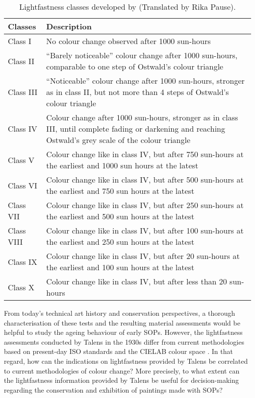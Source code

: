 \begin{table*}[!h]
\caption[\hspace{0.3cm}Description of the lightfastness classes developed by H. Wagner]{Lightfastness classes developed by \citet[p.33]{wagner_korperfarben_1928} (Translated by Rika Pause).}
\centering
\begin{tabular}{p{2cm}p{12cm}}
\toprule[0.4mm]
\textbf{Classes} & \textbf{Description} \\\midrule
Class I & No colour change observed after 1000 sun-hours  \\ 
Class II & “Barely noticeable” colour change after 1000 sun-hours, comparable to one step of Ostwald’s colour triangle \\
Class III & “Noticeable” colour change after 1000 sun-hours, stronger as in class II, but not more than 4 steps of Ostwald’s colour triangle \\
Class IV & Colour change after 1000 sun-hours, stronger as in class III, until complete fading or darkening and reaching Ostwald’s grey scale of the colour triangle \\
Class V & Colour change like in class IV, but after 750 sun-hours at the earliest and 1000 sun hours at the latest \\
Class VI & Colour change like in class IV, but after 500 sun-hours at the earliest and 750 sun hours at the latest \\
Class VII & Colour change like in class IV, but after 250 sun-hours at the earliest and 500 sun hours at the latest\\
Class VIII & Colour change like in class IV, but after 100 sun-hours at the earliest and 250 sun hours at the latest \\
Class IX & Colour change like in class IV, but after 20 sun-hours at the earliest and 100 sun hours at the latest \\
Class X & Colour change like in class IV, but after less than 20 sun-hours \\\bottomrule[0.4mm]
\end{tabular}
\label{tab:Wagner_classes}
\end{table*}

From today's technical art history and conservation perspectives, a thorough characterisation of these tests and the resulting material assessments would be helpful to study the ageing behaviour of early \gls{SOP}s. However, the lightfastness assessments conducted by Talens in the 1930s differ from current methodologies based on present-day ISO standards \citep{international_organization_for_standardization_textiles_2014} and the CIELAB colour space \citep{schanda_colorimetry_2007}. In that regard, how can the indications on lightfastness provided by Talens be correlated to current methodologies of colour change? More precisely, to what extent can the lightfastness information provided by Talens be useful for decision-making regarding the conservation and exhibition of paintings made with \gls{SOP}s?\\

